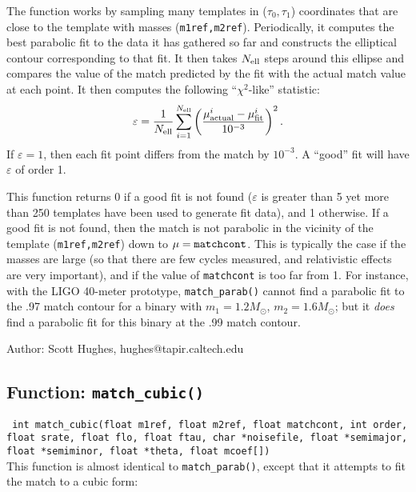 The function works by sampling many templates in ($\tau_0,\tau_1$)
coordinates that are close to the template with masses
({\tt m1ref,m2ref}).  Periodically, it computes the best parabolic fit
to the data it has gathered so far and constructs the elliptical
contour corresponding to that fit.  It then takes $N_{\rm ell}$ steps
around this ellipse and compares the value of the match predicted
by the fit with the actual match value at each point.  It then computes
the following ``$\chi^2$-like'' statistic:
\begin{equation}
\varepsilon = {1\over N_{\rm ell}}\sum_{i=1}^{N_{\rm ell}}
\left(\mu_{\rm actual}^i - \mu_{\rm fit}^i\over 10^{-3}\right)^2.
\end{equation}
If $\varepsilon=1$, then each fit point differs from the match by
$10^{-3}$.  A ``good'' fit will have $\varepsilon$ of order 1.

This function returns 0 if a good fit is not found ($\varepsilon$
is greater than 5 yet more than 250 templates have been
used to generate fit data), and 1 otherwise.  If a good fit is
not found, then the match is not parabolic in the vicinity of the
template ({\tt m1ref,m2ref}) down to $\mu={\tt matchcont}$.  This
is typically the case if the masses are large (so that there are
few cycles measured, and relativistic effects are very important),
and if the value of {\tt matchcont} is too far from 1.  For instance,
with the LIGO 40-meter prototype, {\tt match\_parab()} cannot
find a parabolic fit to the .97 match contour for a binary with
$m_1 = 1.2 M_\odot$, $m_2 = 1.6 M_\odot$; but it {\it does} find
a parabolic fit for this binary at the .99 match contour.

\begin{description}
\item{Author:} Scott Hughes, hughes@tapir.caltech.edu
\end{description}

\clearpage
\subsection{Function: \tt{match\_cubic()}}
\label{ss:match_cubic}

{\tt
int match\_cubic(float m1ref, float m2ref, float matchcont, int order, float srate, 
                float flo, float ftau, char *noisefile, float *semimajor, 
                float *semiminor, float *theta, float mcoef[])
}\\
This function is almost identical to {\tt match\_parab()}, except
that it attempts to fit the match to a cubic form:

